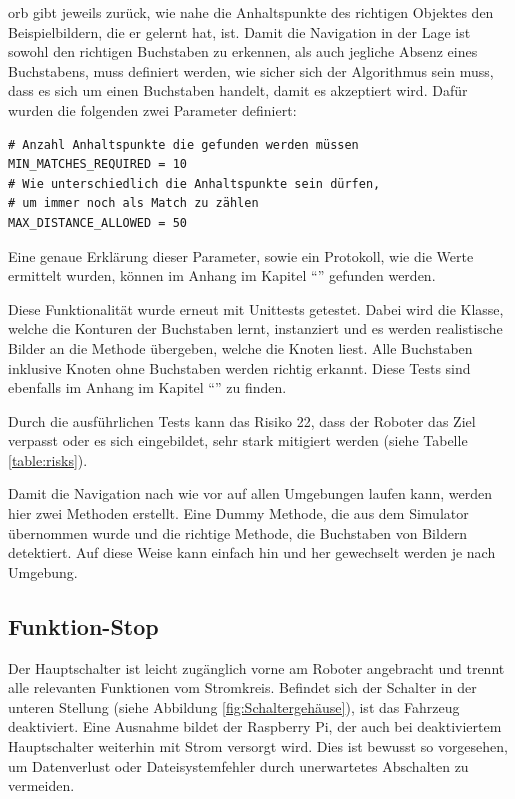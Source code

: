 \acrshort{orb} gibt jeweils zurück, wie nahe die Anhaltspunkte des richtigen Objektes den Beispielbildern, die er gelernt hat, ist. Damit die Navigation in der Lage ist sowohl den richtigen Buchstaben zu erkennen, als auch jegliche Absenz eines Buchstabens, muss definiert werden, wie sicher sich der Algorithmus sein muss, dass es sich um einen Buchstaben handelt, damit es akzeptiert wird. Dafür wurden die folgenden zwei Parameter definiert:
\begin{verbatim}
# Anzahl Anhaltspunkte die gefunden werden müssen
MIN_MATCHES_REQUIRED = 10
# Wie unterschiedlich die Anhaltspunkte sein dürfen,
# um immer noch als Match zu zählen
MAX_DISTANCE_ALLOWED = 50
\end{verbatim}

Eine genaue Erklärung dieser Parameter, sowie ein Protokoll, wie die Werte ermittelt wurden, können im Anhang im Kapitel ``'' gefunden werden.

Diese Funktionalität wurde erneut mit Unittests getestet.
Dabei wird die Klasse, welche die Konturen der Buchstaben lernt, instanziert und es werden realistische Bilder an die Methode übergeben, welche die Knoten liest. Alle Buchstaben inklusive Knoten ohne Buchstaben werden richtig erkannt. Diese Tests sind ebenfalls im Anhang im Kapitel ``'' zu finden.

Durch die ausführlichen Tests kann das Risiko 22, dass der Roboter das Ziel verpasst oder es sich eingebildet, sehr stark mitigiert werden (siehe Tabelle \ref{table:risks}).

Damit die Navigation nach wie vor auf allen Umgebungen laufen kann, werden hier zwei Methoden erstellt. Eine Dummy Methode, die aus dem Simulator übernommen wurde und die richtige Methode, die Buchstaben von Bildern detektiert. Auf diese Weise kann einfach hin und her gewechselt werden je nach Umgebung.


\newpage
\subsection{Funktion-Stop}


Der Hauptschalter ist leicht zugänglich vorne am Roboter angebracht und trennt alle relevanten Funktionen vom Stromkreis. Befindet sich der Schalter in der unteren Stellung (siehe Abbildung \ref{fig:Schaltergehäuse}), ist das Fahrzeug deaktiviert.
Eine Ausnahme bildet der Raspberry Pi, der auch bei deaktiviertem Hauptschalter weiterhin mit Strom versorgt wird. Dies ist bewusst so vorgesehen, um Datenverlust oder Dateisystemfehler durch unerwartetes Abschalten zu vermeiden.

